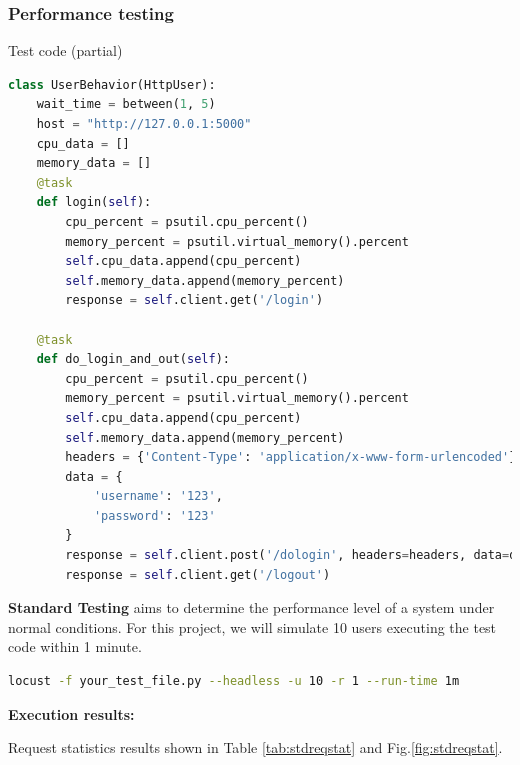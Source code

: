 \documentclass[journal]{IEEEtran}
\begin{document}
\subsubsection{Performance testing}
Test code (partial)
\begin{lstlisting}[caption={Test code (partial)},label={lst:testcode},language=python,breaklines=true]
class UserBehavior(HttpUser):
    wait_time = between(1, 5)
    host = "http://127.0.0.1:5000"
    cpu_data = []
    memory_data = []
    @task
    def login(self):
        cpu_percent = psutil.cpu_percent()
        memory_percent = psutil.virtual_memory().percent
        self.cpu_data.append(cpu_percent)
        self.memory_data.append(memory_percent)
        response = self.client.get('/login')

    @task
    def do_login_and_out(self):
        cpu_percent = psutil.cpu_percent()
        memory_percent = psutil.virtual_memory().percent
        self.cpu_data.append(cpu_percent)
        self.memory_data.append(memory_percent)
        headers = {'Content-Type': 'application/x-www-form-urlencoded'}
        data = {
            'username': '123',
            'password': '123'
        }
        response = self.client.post('/dologin', headers=headers, data=data)
        response = self.client.get('/logout')
  \end{lstlisting}

\textbf{Standard Testing} aims to determine the performance level of a system under normal conditions. For this project, we will simulate 10 users executing the test code within 1 minute. 
\begin{lstlisting}[label={lst:locustcmd},language=BASH,breaklines=true]
locust -f your_test_file.py --headless -u 10 -r 1 --run-time 1m
\end{lstlisting}

\textbf{Execution results:}

Request statistics results shown in Table \ref{tab:stdreqstat} and Fig.\ref{fig:stdreqstat}.







\end{document}
